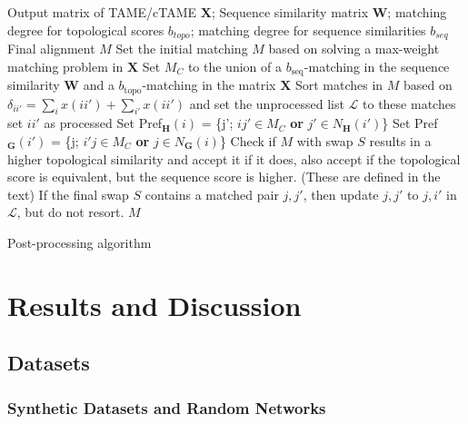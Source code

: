 \documentclass[10pt, journal, compsoc, final]{IEEEtran}
\newcommand{\bs}[1]{\boldsymbol{#1}}
\newcommand{\Matrix}[1]{\mathbf{#1}}
\newcommand{\Graph}[1]{\mathit{\mathbf{\bs{#1}}}}
\newcommand{\Set}[1]{\mathit{#1}}
\begin{document}
\begin{algorithm}
\centering\footnotesize
\begin{algorithmic}[1]
\REQUIRE Output matrix of TAME/cTAME $\Matrix{X}$; Sequence similarity matrix $\Matrix{W}$; matching degree for topological scores $b_{topo}$; matching degree for sequence similarities $b_{seq}$
\ENSURE Final alignment $M$
\STATE Set the initial matching $M$ based on solving a max-weight matching problem in $\Matrix{X}$
\STATE Set $\Set{M}_C$ to the union of a $b_{\text{seq}}$-matching in the sequence similarity $\Matrix{W}$ and a $b_\text{topo}$-matching in the matrix $\Matrix{X}$
\STATE Sort matches in $\Set{M}$ based on $\delta_{ii'} = \sum_i x({ii'}) + \sum_{i'} x({ii'})$ and set the unprocessed list $\mathcal{L}$ to these matches
\STATE set $ii'$ as processed 
\STATE Set Pref$_\Graph{H}(i)$ = \{j'; $ij' \in \Set{M}_C$ \textbf{or} $j' \in \Set{N}_\Graph{H}(i')$\}
\STATE Set Pref$_\Graph{G}(i')$ = \{j; $i'j \in \Set{M}_C$ \textbf{or} $j \in \Set{N}_\Graph{G}(i)$\}
\STATE Check if $M$ with swap $S$ results in a higher topological similarity and accept it if it does, also accept if the topological score is equivalent, but the sequence score is higher. (These are defined in the text)
\ENDFOR
\STATE If the final swap $S$ contains a matched pair $j,j'$, then update $j,j'$ to $j,i'$ in $\mathcal{L}$, but do not resort.
\ENDFOR
\ENDFOR
\RETURN $\Set{M}$
\end{algorithmic}
\caption{Post-processing algorithm}
\label{alg:postProc}
\end{algorithm}


\section{Results and Discussion}
\label{sec:results}

\subsection{Datasets}

\subsubsection{Synthetic Datasets and Random Networks}
\end{document}
